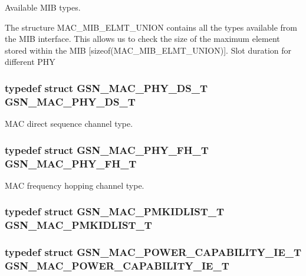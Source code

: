 Available MIB types. 

The structure MAC\_\-MIB\_\-ELMT\_\-UNION contains all the types available from the MIB interface. This allows us to check the size of the maximum element stored within the MIB \mbox{[}sizeof(MAC\_\-MIB\_\-ELMT\_\-UNION)\mbox{]}. Slot duration for different PHY \hypertarget{a00642_gaaa415fc5bf3610b9f39d91d220983e10}{
\subsubsection[{GSN\_\-MAC\_\-PHY\_\-DS\_\-T}]{\setlength{\rightskip}{0pt plus 5cm}typedef struct {\bf GSN\_\-MAC\_\-PHY\_\-DS\_\-T}  {\bf GSN\_\-MAC\_\-PHY\_\-DS\_\-T}}}
\label{a00642_gaaa415fc5bf3610b9f39d91d220983e10}


MAC direct sequence channel type. 

\hypertarget{a00642_ga929013282703665ac236cdc91ee3c3f7}{
\subsubsection[{GSN\_\-MAC\_\-PHY\_\-FH\_\-T}]{\setlength{\rightskip}{0pt plus 5cm}typedef struct {\bf GSN\_\-MAC\_\-PHY\_\-FH\_\-T}  {\bf GSN\_\-MAC\_\-PHY\_\-FH\_\-T}}}
\label{a00642_ga929013282703665ac236cdc91ee3c3f7}


MAC frequency hopping channel type. 

\hypertarget{a00642_ga93df35fe1df8b6cf9f020c78019dd58c}{
\subsubsection[{GSN\_\-MAC\_\-PMKIDLIST\_\-T}]{\setlength{\rightskip}{0pt plus 5cm}typedef struct {\bf GSN\_\-MAC\_\-PMKIDLIST\_\-T}  {\bf GSN\_\-MAC\_\-PMKIDLIST\_\-T}}}
\label{a00642_ga93df35fe1df8b6cf9f020c78019dd58c}
\hypertarget{a00642_ga7dca958f849da86237513f7adc55ed53}{
\subsubsection[{GSN\_\-MAC\_\-POWER\_\-CAPABILITY\_\-IE\_\-T}]{\setlength{\rightskip}{0pt plus 5cm}typedef struct {\bf GSN\_\-MAC\_\-POWER\_\-CAPABILITY\_\-IE\_\-T}  {\bf GSN\_\-MAC\_\-POWER\_\-CAPABILITY\_\-IE\_\-T}}}
\label{a00642_ga7dca958f849da86237513f7adc55ed53}


